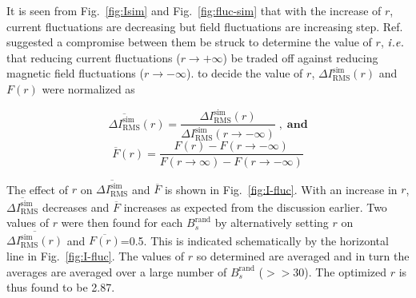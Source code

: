 
It is seen from Fig.~\ref{fig:Isim} and Fig.~\ref{fig:fluc-sim} that with the increase of $r$, current fluctuations are decreasing but field fluctuations are increasing step. Ref.~\cite{bea} suggested a compromise between them be struck to determine the value of $r$, $\it i.e.$ that reducing current fluctuations ($r \rightarrow + \infty$) be traded off against reducing magnetic field fluctuations ($r \rightarrow - \infty$). to decide the value of $r$, $\Delta I_{\text{RMS}}^{\text{sim}}(r)$ and $F(r)$ were normalized as

\begin{equation}\label{eq:Inorm}
    \overline{\Delta I_{\text{RMS}}^{\text{sim}}}(r)=\frac{\Delta I_{\text{RMS}}^{\text{sim}}(r)}{\Delta I_{\text{RMS}}^{\text{sim}}(r\rightarrow - \infty)} \;\mathbf{,\;and}
\end{equation}
\begin{equation}\label{eq:flucNorm}
    \overline{F}(r)=\frac{F(r)- F(r\rightarrow - \infty)}{F(r\rightarrow \infty)- F(r\rightarrow - \infty)}
\end{equation}


The effect of $r$ on $\overline{\Delta I_{\text{RMS}}^{\text{sim}}}$ and $\overline{F}$ is shown in Fig.~\ref{fig:I-fluc}. With an increase in $r$, $\overline{\Delta I_{\text{RMS}}^{\text{sim}}}$ decreases and $\overline{F}$ increases as expected from the discussion earlier.
Two values of $r$ were then found for each $B_s^{\text{rand}}$ by alternatively setting $r$ on $\overline{\Delta I_{\text{RMS}}^{\text{sim}}(r)}$ and $\overline{F(r)}$=0.5. This is indicated schematically by the horizontal line in Fig.~\ref{fig:I-fluc}. The values of $r$ so determined are averaged and in turn the averages are averaged over a large number of $B_s^{\text{rand}}$ ($>>$30). The optimized $r$ is thus found to be 2.87.

